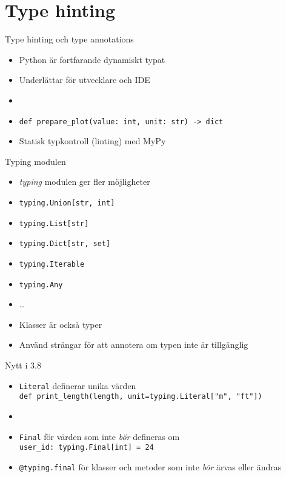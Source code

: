 \section{Type hinting}

\begin{frame}{Type hinting och type annotations}
  \begin{itemize}
    \item Python är fortfarande dynamiskt typat
    \item Underlättar för utvecklare och IDE
    \item[]
    \item \texttt{def prepare_plot(value: int, unit: str) -> dict}
    \item Statisk typkontroll (linting) med MyPy
  \end{itemize}

\end{frame}

\begin{frame}{Typing modulen}
  \begin{itemize}
    \item \emph{typing} modulen ger fler möjligheter
    \item \texttt{typing.Union[str, int]}
    \item \texttt{typing.List[str]}
    \item \texttt{typing.Dict[str, set]}
    \item \texttt{typing.Iterable}
    \item \texttt{typing.Any}
    \item …
    \item Klasser är också typer
    \item Använd strängar för att annotera om typen inte är tillgänglig
  \end{itemize}
\end{frame}

\begin{frame}[fragile]{Nytt i 3.8}
  \begin{itemize}
    \item \texttt{Literal} definerar unika värden\\
          {\small\texttt{def print_length(length, unit=typing.Literal["m", "ft"])}}
    \item[]
    \item \texttt{Final} för värden som inte \emph{bör} defineras om\\
          \texttt{user_id: typing.Final[int] = 24}
    \item \texttt{@typing.final} för klasser och metoder som inte \emph{bör} ärvas eller ändras
  \end{itemize}
\end{frame}


